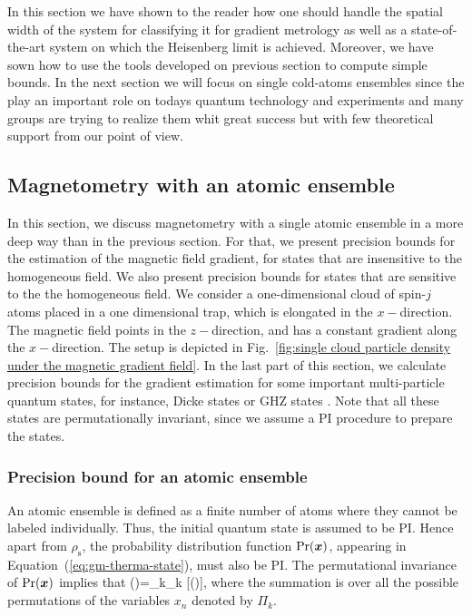 In this section we have shown to the reader how one should handle the spatial width of the system for classifying it for gradient metrology as well as a state-of-the-art system on which the Heisenberg limit is achieved. Moreover, we have sown how to use the tools developed on previous section to compute simple bounds. In the next section we will focus on single cold-atoms ensembles since the play an important role on todays quantum technology and experiments and many groups are trying to realize them whit great success but with few theoretical support from our point of view.

\subsection{Magnetometry with an atomic ensemble}
\label{sec:gm-single-cloud}

In this section, we discuss magnetometry with a single
atomic ensemble in a more deep way than in the previous section.
For that, we present precision bounds for
the estimation of the magnetic field gradient, for
states that are insensitive to the homogeneous field.
We also present precision bounds for states that are sensitive to the
the homogeneous field.
We consider a one-dimensional cloud of spin-$j$ atoms
placed in a one dimensional trap, which is elongated
in the  $x-$direction.
The magnetic field points in the  $z-$direction,
and has a constant gradient along the $x-$direction.
The setup is depicted
in Fig.~\ref{fig:single cloud particle density under the magnetic gradient field}.
In the last part of this section, we calculate precision bounds for the
gradient estimation for some important multi-particle quantum states,
for instance, Dicke states \cite{} or
GHZ states \cite{Greenberger1990}.
Note that all these states are permutationally invariant, since we
assume a PI procedure to prepare the states.

\subsubsection{Precision bound for an atomic ensemble}

An atomic ensemble is defined as a finite number of atoms where
they cannot be labeled individually.
Thus, the initial quantum state is assumed to be PI.
Hence apart from $\rho_{\text{s}}$, the probability distribution function
$\text{Pr}(\boldsymbol{x})$, appearing in Equation~(\ref{eq:gm-therma-state}),
must also be PI.
The permutational invariance of $\text{Pr}(\boldsymbol{x})$ implies that
\be
\label{eq:gm-pi-for-pdf}
\prob()=\sum_{k}\Pi_k [\prob()],
\ee
where the summation is over all the possible permutations
of the variables $x_n$ denoted by
$\Pi_k.$

